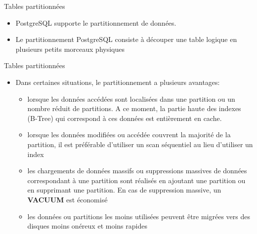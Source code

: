 
\begin{frame}[fragile]{Tables partitionnées}

   \begin{itemize}
      \item PostgreSQL supporte le partitionnement de données.
      \item Le partitionnement PostgreSQL consiste à découper une table logique en plusieurs petits morceaux physiques

   \end{itemize}

\begin{toile}
\end{toile}

\end{frame}


\begin{frame}[fragile]{Tables partitionnées}

   \begin{itemize}
      \item Dans certaines situations, le partitionnement a plusieurs avantages:
      \begin{itemize}
         \item lorsque les données accédées sont localisées dans une partition ou un nombre réduit de partitions. A ce moment, la partie haute des indexes (B-Tree) qui correspond à ces données est entièrement en cache.
         \item lorsque les données modifiées ou accédée couvrent la majorité de la partition, il est préférable d'utiliser un scan séquentiel au lieu d'utiliser un index
         \item les chargements de données massifs ou suppressions massives de données correspondant à une partition sont réalisés en ajoutant une partition ou en supprimant une partition. En cas de suppression massive, un \textbf{VACUUM} est économisé
         \item les données ou partitions les moins utilisées peuvent être migrées vers des disques moins onéreux et moins rapides
      \end{itemize}

   \end{itemize}

\end{frame}


